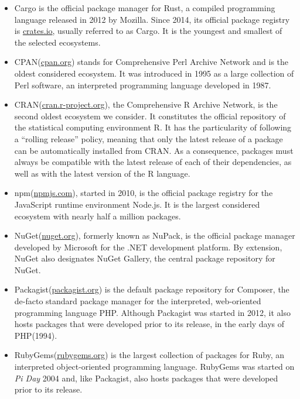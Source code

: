 \documentclass[smallextended]{svjour3}       %
\newcommand{\cran}{\textsf{CRAN}\xspace}
\newcommand{\cpan}{\textsf{CPAN}\xspace}
\newcommand{\rubygems}{\textsf{RubyGems}\xspace}
\newcommand{\packagist}{\textsf{Packagist}\xspace}
\newcommand{\cargo}{\textsf{Cargo}\xspace}
\newcommand{\nuget}{\textsf{NuGet}\xspace}
\newcommand{\npm}{\textsf{npm}\xspace}
\newcommand{\javascript}{\textsf{JavaScript}\xspace}
\newcommand{\ruby}{\textsf{Ruby}\xspace}
\newcommand{\R}{\textsf{R}\xspace}
\newcommand{\perl}{\textsf{Perl}\xspace}
\newcommand{\php}{\textsf{PHP}\xspace}
\newcommand{\rust}{\textsf{Rust}\xspace}
\newcommand{\dotnet}{\textsf{.NET}\xspace}
\begin{document}
\begin{itemize}
\item \cargo is the official package manager for \rust, a compiled programming language released in 2012 by Mozilla. Since 2014, its official package registry is \url{crates.io}, usually referred to as \cargo. It is the youngest and smallest of the selected ecosystems. 

\item \cpan (\url{cpan.org}) stands for Comprehensive Perl Archive Network and is the oldest considered ecosystem. It was introduced in 1995 as a large collection of \perl software, an interpreted programming language developed in 1987. 

\item \cran (\url{cran.r-project.org}), the Comprehensive R Archive Network, is the second oldest ecosystem we consider. It constitutes the official repository of the statistical computing environment \R. It has the particularity of following a ``rolling release'' policy, meaning that only the latest release of a package can be automatically installed from \cran. As a consequence, packages must always be compatible with the latest release of each of their dependencies, as well as with the latest version of the \R language. 

\item \npm (\url{npmjs.com}), started in 2010, is the official package registry for the \javascript runtime environment \textsf{Node.js}. It is the largest considered ecosystem with nearly half a million packages.

\item \nuget (\url{nuget.org}), formerly known as \textsf{NuPack}, is the official package manager developed by Microsoft for the \dotnet development platform.  
By extension, \nuget also designates \textsf{NuGet Gallery}, the central package repository for \nuget. 

\item \packagist (\url{packagist.org}) is the default package repository for \textsf{Composer}, the de-facto standard package manager for the interpreted, web-oriented programming language \php. Although \packagist was started in 2012, it also hosts packages that were developed prior to its release, in the early days of \php (1994).

\item \rubygems (\url{rubygems.org}) is the largest collection of packages for \ruby, an interpreted object-oriented programming language. \rubygems was started on \textit{Pi Day} 2004 and, like \packagist, also hosts packages that were developed prior to its release.
\end{itemize}
\end{document}
